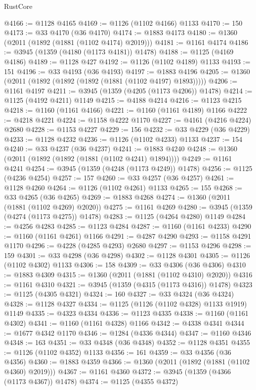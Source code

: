 \begin{lexlean}{RustCore}
\begin{coremodule}
@4166 := @1128 @4165
@4169 := @1126 (@1102 @4166) @1133
@4170 := 150
@4173 := @33 @4170 (@36 @4170)
@4174 := @1883 @4173
@4180 := @1360 (@2011 (@1892 (@1881 (@1102 @4174) @2019)))
@4181 := @1161 @4174
@4186 := @3945 (@1359 (@4180 (@1173 @4181)) @1478)
@4188 := @1125 (@4169 @4186)
@4189 := @1128 @427
@4192 := @1126 (@1102 @4189) @1133
@4193 := 151
@4196 := @33 @4193 (@36 @4193)
@4197 := @1883 @4196
@4205 := @1360 (@2011 (@1892 (@1892 (@1892 (@1881 (@1102 @4197) @1893)))))
@4206 := @1161 @4197
@4211 := @3945 (@1359 (@4205 (@1173 @4206)) @1478)
@4214 := @1125 (@4192 @4211) @1149
@4215 := @4188 @4214
@4216 := @1123 @4215
@4218 := @1160 (@1161 @4166)
@4221 := @1160 (@1161 @4189) @1166
@4222 := @4218 @4221
@4224 := @1158 @4222 @1170
@4227 := @4161 (@4216 @4224) @2680
@4228 := @1153 @4227
@4229 := 156
@4232 := @33 @4229 (@36 @4229)
@4233 := @1128 @4232
@4236 := @1126 (@1102 @4233) @1133
@4237 := 154
@4240 := @33 @4237 (@36 @4237)
@4241 := @1883 @4240
@4248 := @1360 (@2011 (@1892 (@1892 (@1881 (@1102 @4241) @1894))))
@4249 := @1161 @4241
@4254 := @3945 (@1359 (@4248 (@1173 @4249)) @1478)
@4256 := @1125 (@4236 @4254)
@4257 := 157
@4260 := @33 @4257 (@36 @4257)
@4261 := @1128 @4260
@4264 := @1126 (@1102 @4261) @1133
@4265 := 155
@4268 := @33 @4265 (@36 @4265)
@4269 := @1883 @4268
@4274 := @1360 (@2011 (@1881 (@1102 @4269) @2020))
@4275 := @1161 @4269
@4280 := @3945 (@1359 (@4274 (@1173 @4275)) @1478)
@4283 := @1125 (@4264 @4280) @1149
@4284 := @4256 @4283
@4285 := @1123 @4284
@4287 := @1160 (@1161 @4233)
@4290 := @1160 (@1161 @4261) @1166
@4291 := @4287 @4290
@4293 := @1158 @4291 @1170
@4296 := @4228 (@4285 @4293) @2680
@4297 := @1153 @4296
@4298 := 159
@4301 := @33 @4298 (@36 @4298)
@4302 := @1128 @4301
@4305 := @1126 (@1102 @4302) @1133
@4306 := 158
@4309 := @33 @4306 (@36 @4306)
@4310 := @1883 @4309
@4315 := @1360 (@2011 (@1881 (@1102 @4310) @2020))
@4316 := @1161 @4310
@4321 := @3945 (@1359 (@4315 (@1173 @4316)) @1478)
@4323 := @1125 (@4305 @4321)
@4324 := 160
@4327 := @33 @4324 (@36 @4324)
@4328 := @1128 @4327
@4334 := @1125 (@1126 (@1102 @4328) @1133 @1919) @1149
@4335 := @4323 @4334
@4336 := @1123 @4335
@4338 := @1160 (@1161 @4302)
@4341 := @1160 (@1161 @4328) @1166
@4342 := @4338 @4341
@4344 := @1677 @4342 @1170
@4346 := @1284 (@4336 @4344)
@4347 := @1160 @4346
@4348 := 163
@4351 := @33 @4348 (@36 @4348)
@4352 := @1128 @4351
@4355 := @1126 (@1102 @4352) @1133
@4356 := 161
@4359 := @33 @4356 (@36 @4356)
@4360 := @1883 @4359
@4366 := @1360 (@2011 (@1892 (@1881 (@1102 @4360) @2019)))
@4367 := @1161 @4360
@4372 := @3945 (@1359 (@4366 (@1173 @4367)) @1478)
@4374 := @1125 (@4355 @4372)

\end{coremodule}
\end{lexlean}
